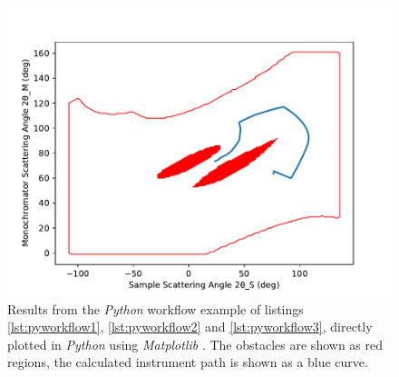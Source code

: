 \begin{figure}[htb]
		\begin{center}
			\includegraphics[width = 0.66 \textwidth]{figures/pyworkflow}
		\end{center}
	\caption[Python workflow results.]{Results from the \textit{Python} workflow example of listings
		\ref{lst:pyworkflow1}, \ref{lst:pyworkflow2} and \ref{lst:pyworkflow3}, directly plotted 
		in \textit{Python} using \textit{Matplotlib} \cite{web_matplotlib}.
		The obstacles are shown as red regions, the calculated instrument path is shown as a blue curve.
		\label{fig:pyworkflow}}
\end{figure}


